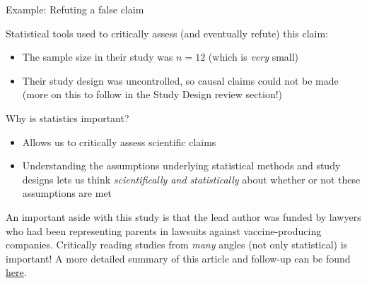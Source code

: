 \documentclass[10pt,t]{beamer}
\begin{document}
\begin{frame}{Example: Refuting a false claim}

Statistical tools used to critically assess (and eventually refute) this claim:
\begin{itemize}
	\item The sample size in their study was $n = 12$ (which is \textit{very} small)
	\item Their study design was uncontrolled, so causal claims could not be made (more on this to follow in the Study Design review section!)
\end{itemize}

\vspace{0.3cm}

Why is statistics important?
\begin{itemize}
	\item Allows us to critically assess scientific claims
	\item Understanding the assumptions underlying statistical methods and study designs lets us think \textit{scientifically and statistically} about whether or not these assumptions are met
\end{itemize}

\vspace{0.3cm}

\footnotesize An important aside with this study is that the lead author was funded by lawyers who had been representing parents in lawsuits against vaccine-producing companies. Critically reading studies from \textit{many} angles (not only statistical) is important! A more detailed summary of this article and follow-up can be found \href{https://www.ncbi.nlm.nih.gov/pmc/articles/PMC3136032/}{\color{cyan} here}.

\end{frame}
\end{document}
